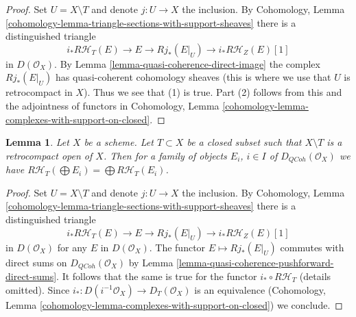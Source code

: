 \documentclass{stacks-project}
\theoremstyle{plain}
\newtheorem{lemma}[subsection]{Lemma}
\theoremstyle{definition}
\theoremstyle{remark}
\numberwithin{equation}{subsection}
\def\QCoh{\mathit{QCoh}}
\begin{document}
\begin{proof}
Set $U = X \setminus T$ and denote $j : U \to X$ the inclusion. By
Cohomology, Lemma \ref{cohomology-lemma-triangle-sections-with-support-sheaves}
there is a distinguished triangle
$$
i_*R\mathcal{H}_T(E) \to E \to Rj_*(E|_U) \to i_*R\mathcal{H}_Z(E)[1]
$$
in $D(\mathcal{O}_X)$. By Lemma \ref{lemma-quasi-coherence-direct-image}
the complex $Rj_*(E|_U)$ has quasi-coherent cohomology sheaves
(this is where we use that $U$ is retrocompact in $X$).
Thus we see that (1) is true. Part (2) follows from this and
the adjointness of functors in
Cohomology, Lemma \ref{cohomology-lemma-complexes-with-support-on-closed}.
\end{proof}

\begin{lemma}
\label{lemma-support-direct-sums}
Let $X$ be a scheme. Let $T \subset X$ be a closed subset such that
$X \setminus T$ is a retrocompact open of $X$. Then for a family of
objects $E_i$, $i \in I$ of $D_\QCoh(\mathcal{O}_X)$ we have
$R\mathcal{H}_T(\bigoplus E_i) = \bigoplus R\mathcal{H}_T(E_i)$.
\end{lemma}

\begin{proof}
Set $U = X \setminus T$ and denote $j : U \to X$ the inclusion. By
Cohomology, Lemma \ref{cohomology-lemma-triangle-sections-with-support-sheaves}
there is a distinguished triangle
$$
i_*R\mathcal{H}_T(E) \to E \to Rj_*(E|_U) \to i_*R\mathcal{H}_Z(E)[1]
$$
in $D(\mathcal{O}_X)$ for any $E$ in $D(\mathcal{O}_X)$. The functor
$E \mapsto Rj_*(E|_U)$ commutes with direct sums on $D_\QCoh(\mathcal{O}_X)$
by Lemma \ref{lemma-quasi-coherence-pushforward-direct-sums}.
It follows that the same is true for the functor $i_* \circ R\mathcal{H}_T$
(details omitted). Since $i_* : D(i^{-1}\mathcal{O}_X) \to D_T(\mathcal{O}_X)$
is an equivalence
(Cohomology, Lemma \ref{cohomology-lemma-complexes-with-support-on-closed})
we conclude.
\end{proof}
\end{document}
